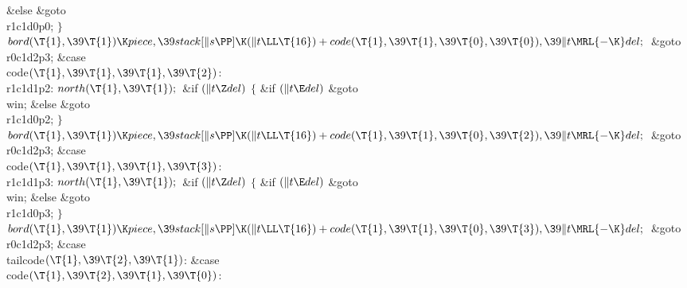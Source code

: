 \2\&{else}\1\5
\&{goto} \\{r1c1d0p0};\5
\2${}\}{}$\2\6
${}\\{bord}(\T{1},\39\T{1})\K\\{piece},\39\\{stack}[\|s\PP]\K(\|t\LL\T{16})+%
\\{code}(\T{1},\39\T{1},\39\T{0},\39\T{0}),\39\|t\MRL{-{\K}}\\{del};{}$\6
\&{goto} \\{r0c1d2p3};\6
\4\&{case} \\{code}${}(\T{1},\39\T{1},\39\T{1},\39\T{2}){}$:\5
\\{r1c1d1p2}:\5
${}\\{north}(\T{1},\39\T{1});{}$\6
\&{if} ${}(\|t\Z\\{del}){}$\5
${}\{{}$\5
\1\&{if} ${}(\|t\E\\{del}){}$\1\5
\&{goto} \\{win};\5
\2\&{else}\1\5
\&{goto} \\{r1c1d0p2};\5
\2${}\}{}$\2\6
${}\\{bord}(\T{1},\39\T{1})\K\\{piece},\39\\{stack}[\|s\PP]\K(\|t\LL\T{16})+%
\\{code}(\T{1},\39\T{1},\39\T{0},\39\T{2}),\39\|t\MRL{-{\K}}\\{del};{}$\6
\&{goto} \\{r0c1d2p3};\6
\4\&{case} \\{code}${}(\T{1},\39\T{1},\39\T{1},\39\T{3}){}$:\5
\\{r1c1d1p3}:\5
${}\\{north}(\T{1},\39\T{1});{}$\6
\&{if} ${}(\|t\Z\\{del}){}$\5
${}\{{}$\5
\1\&{if} ${}(\|t\E\\{del}){}$\1\5
\&{goto} \\{win};\5
\2\&{else}\1\5
\&{goto} \\{r1c1d0p3};\5
\2${}\}{}$\2\6
${}\\{bord}(\T{1},\39\T{1})\K\\{piece},\39\\{stack}[\|s\PP]\K(\|t\LL\T{16})+%
\\{code}(\T{1},\39\T{1},\39\T{0},\39\T{3}),\39\|t\MRL{-{\K}}\\{del};{}$\6
\&{goto} \\{r0c1d2p3};\6
\4\&{case} \\{tailcode}${}(\T{1},\39\T{2},\39\T{1}){}$:\5
\&{case} \\{code}${}(\T{1},\39\T{2},\39\T{1},\39\T{0}){}$:\5
